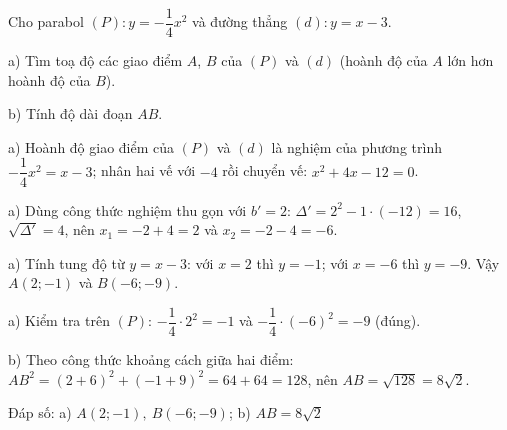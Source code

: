 \begin{problem}[9DS-HSB2-037]
Cho parabol $(P)\colon y = -\dfrac{1}{4}x^2$ và đường thẳng $(d)\colon y = x - 3$.

a) Tìm toạ độ các giao điểm $A$, $B$ của $(P)$ và $(d)$ (hoành độ của $A$ lớn hơn hoành độ của $B$).

b) Tính độ dài đoạn $AB$.

\begin{solution}
a) Hoành độ giao điểm của $(P)$ và $(d)$ là nghiệm của phương trình $-\dfrac{1}{4}x^2 = x - 3$; nhân hai vế với $-4$ rồi chuyển vế: $x^2 + 4x - 12 = 0$.

a) Dùng công thức nghiệm thu gọn với $b' = 2$: $\Delta' = 2^2 - 1 \cdot (-12) = 16$, $\sqrt{\Delta'} = 4$, nên $x_1 = -2 + 4 = 2$ và $x_2 = -2 - 4 = -6$.

a) Tính tung độ từ $y = x - 3$: với $x = 2$ thì $y = -1$; với $x = -6$ thì $y = -9$. Vậy $A(2; -1)$ và $B(-6; -9)$.

a) Kiểm tra trên $(P)$: $-\dfrac{1}{4} \cdot 2^2 = -1$ và $-\dfrac{1}{4} \cdot (-6)^2 = -9$ (đúng).

b) Theo công thức khoảng cách giữa hai điểm: $AB^2 = (2 + 6)^2 + (-1 + 9)^2 = 64 + 64 = 128$, nên $AB = \sqrt{128} = 8\sqrt{2}$.

Đáp số: a) $\boxed{A(2; -1),\ B(-6; -9)}$; b) $\boxed{AB = 8\sqrt{2}}$
\end{solution}
\end{problem}

